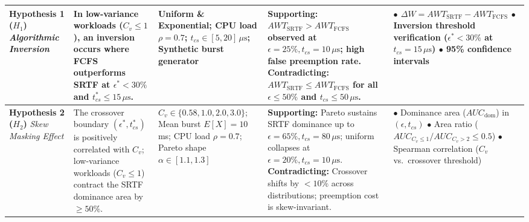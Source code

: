 \documentclass[11pt]{article}
\begin{document}
{{\begin{tabular}{|>{\raggedright\arraybackslash}p{2.0cm}|>{\raggedright\arraybackslash}p{3.5cm}|>{\raggedright\arraybackslash}p{2.6cm}|>{\raggedright\arraybackslash}p{4.5cm}|>{\raggedright\arraybackslash}p{3.3cm}|}
    \textbf{Hypothesis 1 ($H_1$)} \newline \textit{Algorithmic Inversion} & 
    In low-variance workloads ($C_v \le 1$), an inversion occurs where FCFS outperforms SRTF at $\epsilon^* < 30\%$ and $t_{cs}^* \le 15\,\mu\text{s}$. & 
    Uniform \& Exponential; \newline
    CPU load $\rho = 0.7$; \newline
    $t_{cs} \in [5, 20]\,\mu\text{s}$; \newline
    Synthetic burst generator & 
    \textbf{Supporting:} $AWT_{\text{SRTF}} > AWT_{\text{FCFS}}$ observed at $\epsilon = 25\%, t_{cs} = 10\,\mu\text{s}$; high false preemption rate. \newline 
    \textbf{Contradicting:} $AWT_{\text{SRTF}} \le AWT_{\text{FCFS}}$ for all $\epsilon \le 50\%$ and $t_{cs} \le 50\,\mu\text{s}$. & 
    $\bullet$ $\Delta W = AWT_{\text{SRTF}} - AWT_{\text{FCFS}}$ \newline 
    $\bullet$ Inversion threshold verification \newline
    \hspace*{0.8em}($\epsilon^* < 30\%$ at $t_{cs} = 15\,\mu\text{s}$) \newline 
    $\bullet$ 95\% confidence intervals \\
    \hline

    \textbf{Hypothesis 2 ($H_2$)} \newline \textit{Skew Masking Effect} & 
    The crossover boundary $(\epsilon^*, t_{cs}^*)$ is positively correlated with $C_v$; low-variance workloads ($C_v \le 1$) contract the SRTF dominance area by $\ge 50\%$. & 
    $C_v \in \{0.58, 1.0, 2.0, 3.0\}$; \newline
    Mean burst $E[X] = 10$\,ms; \newline
    CPU load $\rho = 0.7$; \newline
    Pareto shape $\alpha \in [1.1, 1.3]$ & 
    \textbf{Supporting:} Pareto sustains SRTF dominance up to $\epsilon = 65\%, t_{cs} = 80\,\mu\text{s}$; uniform collapses at $\epsilon = 20\%, t_{cs} = 10\,\mu\text{s}$. \newline 
    \textbf{Contradicting:} Crossover shifts by $<10\%$ across distributions; preemption cost is skew-invariant. & 
    $\bullet$ Dominance area ($AUC_{\text{dom}}$) in $(\epsilon, t_{cs})$ \newline 
    $\bullet$ Area ratio ($AUC_{C_v \le 1} / AUC_{C_v > 2} \le 0.5$) \newline 
    $\bullet$ Spearman correlation ($C_v$ vs.\ crossover threshold) \\
    \hline

\end{tabular}\par
}
\vspace{-0.6em}
\label{tab:deliverable2_matrix}
}
\end{document}

